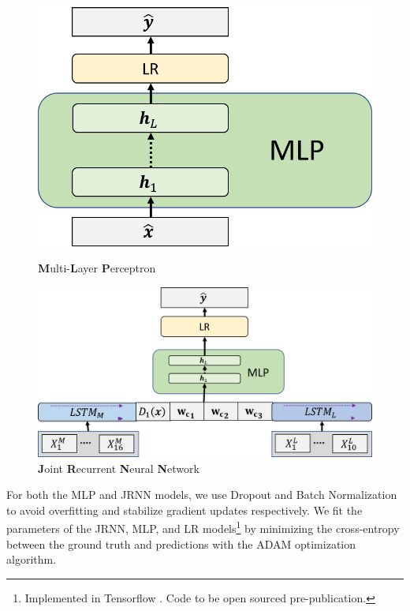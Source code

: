 \documentclass{article} %
\begin{document}
\begin{figure}
\centering
\begin{minipage}{.48\textwidth}
  \centering
\includegraphics[width=.7\textwidth]{pics/dnn.png}
\caption{{\bf M}ulti-{\bf L}ayer {\bf P}erceptron}\label{fig:dnn}
\end{minipage}
\begin{minipage}{.04\textwidth}
\end{minipage}
\begin{minipage}{.48\textwidth}
  \centering
\includegraphics[width=\textwidth]{pics/rnn.png}
\caption{{\bf J}oint {\bf R}ecurrent {\bf N}eural {\bf N}etwork}\label{fig:rnn}
\end{minipage}
\end{figure}

For both the MLP and JRNN models, we use Dropout \citep{srivastava2014dropout} and Batch Normalization \citep{ioffe2015batch} to avoid overfitting and stabilize gradient updates respectively.
We fit the parameters of the JRNN, MLP, and LR models\footnote{Implemented in Tensorflow \citep{abadi2016tensorflow}. Code to be open sourced pre-publication.} by minimizing the cross-entropy
between the ground truth and predictions with the ADAM \citep{kingma2014adam} optimization algorithm. 
\end{document}
